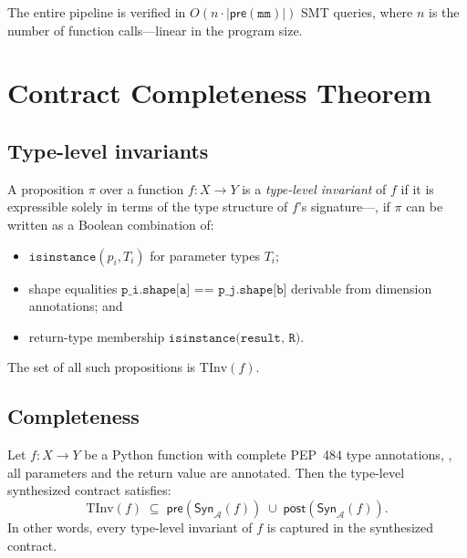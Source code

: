 \documentclass[11pt]{article}
\newcommand{\Syn}{\mathsf{Syn}}            %
\newcommand{\Pre}{\mathsf{pre}}            %
\newcommand{\Post}{\mathsf{post}}          %
\newcommand{\TypeAnn}{\mathcal{A}}         %
\newcommand{\TypeInv}{\mathrm{TInv}}       %
\newcommand{\SynT}{\Syn_{\TypeAnn}}        %
\begin{document}
The entire pipeline is verified in $O(n \cdot |\Pre(\texttt{mm})|)$
SMT queries, where $n$ is the number of function calls---linear in
the program size.

\section{Contract Completeness Theorem}\label{sec:completeness}

\subsection{Type-level invariants}

\begin{definition}\label{def:type-inv}
A proposition $\pi$ over a function $f\colon X \to Y$ is a
\emph{type-level invariant} of $f$ if it is expressible solely in
terms of the type structure of $f$'s signature---\ie, if $\pi$ can be
written as a Boolean combination of:
\begin{itemize}
  \item $\texttt{isinstance}(p_i, T_i)$ for parameter types $T_i$;
  \item shape equalities $\texttt{p\_i.shape[a] == p\_j.shape[b]}$
    derivable from dimension annotations; and
  \item return-type membership $\texttt{isinstance(result, R)}$.
\end{itemize}
The set of all such propositions is $\TypeInv(f)$.
\end{definition}

\subsection{Completeness}

\begin{theorem}\label{thm:completeness}
Let $f\colon X \to Y$ be a Python function with complete PEP~484 type
annotations, \ie, all parameters and the return value are annotated.
Then the type-level synthesized contract satisfies:
\[
  \TypeInv(f) \;\subseteq\; \Pre(\SynT(f)) \;\cup\; \Post(\SynT(f)).
\]
In other words, every type-level invariant of $f$ is captured in the
synthesized contract.
\end{theorem}
\end{document}
